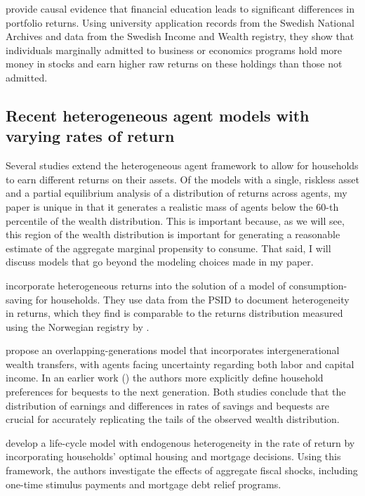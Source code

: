 \par \cite{altmejd2024} provide causal evidence that financial education leads to significant differences in portfolio returns. Using university application records from the Swedish National Archives and data from the Swedish Income and Wealth registry, they show that individuals marginally admitted to business or economics programs hold more money in stocks and earn higher raw returns on these holdings than those not admitted.


\subsection{Recent heterogeneous agent models with varying rates of return}

\par Several studies extend the heterogeneous agent framework to allow for households to earn different returns on their assets. Of the models with a single, riskless asset and a partial equilibrium analysis of a distribution of returns across agents, my paper is unique in that it generates a realistic mass of agents below the 60-th percentile of the wealth distribution. This is important because, as we will see, this region of the wealth distribution is important for generating a reasonable estimate of the aggregate marginal propensity to consume. That said, I will discuss models that go beyond the modeling choices made in my paper. 

\par \cite{Daminato2024} incorporate heterogeneous returns into the solution of a model of consumption-saving for households. They use data from the PSID to document heterogeneity in returns, which they find is comparable to the returns distribution measured using the Norwegian registry by \cite{aflgdmlp20}.

\par \cite{Benhabib2019} propose an overlapping-generations model that incorporates intergenerational wealth transfers, with agents facing uncertainty regarding both labor and capital income. In an earlier work (\cite{jbabml17}) the authors more explicitly define household preferences for bequests to the next generation. Both studies conclude that the distribution of earnings and differences in rates of savings and bequests are crucial for accurately replicating the tails of the observed wealth distribution.

\par \cite{Guler2022} develop a life-cycle model with endogenous heterogeneity in the rate of return by incorporating households' optimal housing and mortgage decisions. Using this framework, the authors investigate the effects of aggregate fiscal shocks, including one-time stimulus payments and mortgage debt relief programs.


